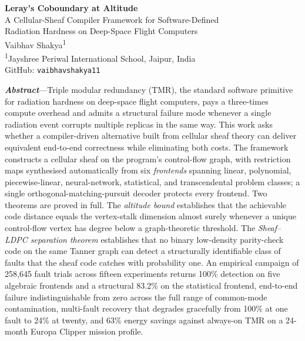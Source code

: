 \documentclass[12pt,a4paper]{article}
\theoremstyle{plain}
\theoremstyle{definition}
\begin{document}
\begin{center}
{\LARGE\bfseries Leray's Coboundary at Altitude}\\[6pt]
{\large A Cellular-Sheaf Compiler Framework for Software-Defined\\
Radiation Hardness on Deep-Space Flight Computers}\\[18pt]
Vaibhav Shakya\textsuperscript{1}\\[4pt]
\textsuperscript{1}Jayshree Periwal International School, Jaipur, India\\[2pt]
{\small GitHub: \texttt{vaibhavshakya11}}\\[14pt]
\end{center}

\noindent\textit{\textbf{Abstract}}---Triple modular redundancy (TMR), the standard software primitive for radiation hardness on deep-space flight computers, pays a three-times compute overhead and admits a structural failure mode whenever a single radiation event corrupts multiple replicas in the same way. This work asks whether a compiler-driven alternative built from cellular sheaf theory can deliver equivalent end-to-end correctness while eliminating both costs. The framework constructs a cellular sheaf on the program's control-flow graph, with restriction maps synthesised automatically from six \textit{frontends} spanning linear, polynomial, piecewise-linear, neural-network, statistical, and transcendental problem classes; a single orthogonal-matching-pursuit decoder protects every frontend. Two theorems are proved in full. The \textit{altitude bound} establishes that the achievable code distance equals the vertex-stalk dimension almost surely whenever a unique control-flow vertex has degree below a graph-theoretic threshold. The \textit{Sheaf--LDPC separation theorem} establishes that no binary low-density parity-check code on the same Tanner graph can detect a structurally identifiable class of faults that the sheaf code catches with probability one. An empirical campaign of 258{,}645 fault trials across fifteen experiments returns 100\% detection on five algebraic frontends and a structural 83.2\% on the statistical frontend, end-to-end failure indistinguishable from zero across the full range of common-mode contamination, multi-fault recovery that degrades gracefully from 100\% at one fault to 24\% at twenty, and 63\% energy savings against always-on TMR on a 24-month Europa Clipper mission profile.
\end{document}
